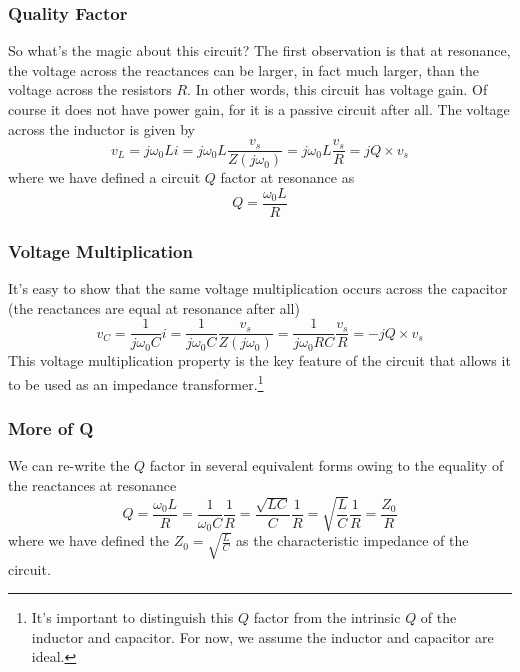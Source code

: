 
\subsubsection{Quality Factor}

So what's the magic about this circuit?  The first observation is that at
resonance, the voltage across the reactances can be larger, in fact much
larger, than the voltage across the resistors $R$.  In other words, this
circuit has voltage gain.  Of course it does not have power gain, for it is a
passive circuit after all.  The voltage across the inductor is given by 
\begin{equation}
  v_L = j\omega_0 L i = j\omega_0 L \frac{v_s}{Z(j\omega_0)} = 
        j\omega_0 L \frac{v_s}{R} = j Q \times v_s
\end{equation}
%
 where we have defined a circuit $Q$ factor at resonance as
%
\begin{equation}
   Q = \frac{\omega_0 L}{R}
\end{equation}


\subsubsection{Voltage Multiplication}
%
 It's easy to show that the same voltage multiplication occurs across the
capacitor (the reactances are equal at resonance after all)
%
\begin{equation}
  v_C = \frac{1}{j\omega_0 C} i = \frac{1}{j\omega_0 C}
  \frac{v_s}{Z(j\omega_0)} = \frac{1}{j\omega_0 R C} \frac{v_s}{R} = - j Q
  \times v_s
\end{equation}
%
This voltage multiplication property is the key feature of the
circuit that allows it to be used as an impedance transformer.\footnote{It's important to distinguish this $Q$ factor from the intrinsic $Q$ of the inductor and capacitor.  For now, we assume the inductor  and capacitor are ideal.}




\subsubsection{More of Q}

We can re-write the $Q$ factor in several equivalent forms owing to
the equality of the reactances at resonance
%
\begin{equation} \label{eq:qdefs}
  Q = \frac{\omega_0 L}{R} = 
      \frac{1}{\omega_0 C} \frac{1}{R} = \frac{\sqrt{LC}}{C} \frac{1}{R} =
  \sqrt{\frac{L}{C}} \frac{1}{R} = \frac{Z_0}{R}
\end{equation}
%
where we have defined the $Z_0 = \sqrt{\tfrac{L}{C}}$ as the characteristic
impedance of the circuit.



